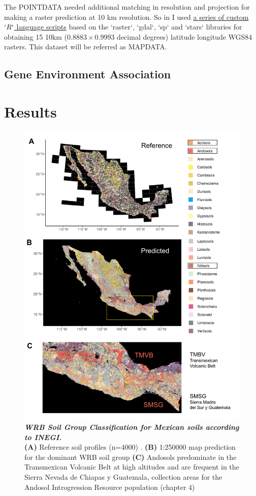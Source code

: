 The POINTDATA needed additional matching in resolution and projection for making a raster prediction at 10 km resolution. So in  I used  \href{https://github.com/sawers-rellan-labs/grassGEA}{a series of custom $`R`$ language scripts} based on the `raster`, `gdal`, `sp` and `stars` libraries for obtaining 15 10km ($0.8883 \times 0.9993$ decimal degrees) latitude longitude WGS84 rasters. This dataset will be referred as MAPDATA.

\subsection*{Gene Environment Association}

\section{Results}

\begin{figure}[!ht]
\centering
\includegraphics[width=0.9\linewidth]{Chapter-2/figs/WRB_inegi2013map.png}
\caption[WRB Soil Group Classification for Mexican soils according to INEGII]{\textit{\textbf{WRB Soil Group Classification for Mexican soils according to INEGI.}} \\\hspace{\textwidth}
\textbf{(A)} Reference soil profiles (n=4000) \citep{inegi2013}.
\textbf{(B)} 1:250000 map prediction for the dominant WRB soil group \citep{inegi2015} \textbf{(C)} Andosols predominate in the Transmexican Volcanic Belt at high altitudes and are frequent in the Sierra Nevada de Chiapas y Guatemala, collection areas for the Andosol Introgression Resource population (chapter 4)}
\label{fig::WRB_inegi2013map}
\end{figure}
\clearpage




